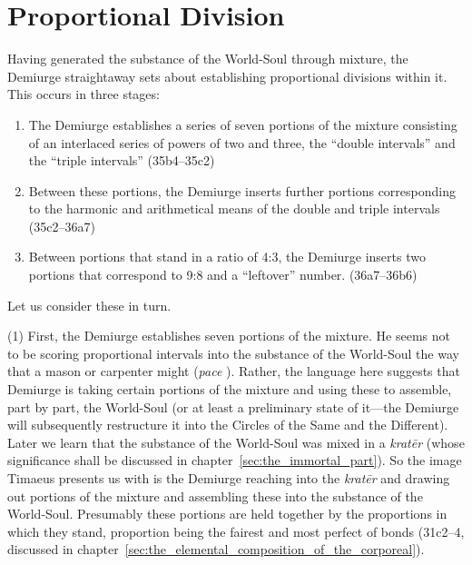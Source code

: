 
\section{Proportional Division} %
\label{sec:proportional_division}

Having generated the substance of the World-Soul through mixture, the Demiurge straightaway sets about establishing proportional divisions within it. This occurs in three stages:
\begin{enumerate}[(1)]
	\item The Demiurge establishes a series of seven portions of the mixture consisting of an interlaced series of powers of two and three, the ``double intervals'' and the ``triple intervals'' (35b4--35c2)
	\item Between these portions, the Demiurge inserts further portions corresponding to the harmonic and arithmetical means of the double and triple intervals (35c2--36a7)
	\item Between portions that stand in a ratio of 4:3, the Demiurge inserts two portions that correspond to 9:8 and a ``leftover'' number. (36a7--36b6)
\end{enumerate}
Let us consider these in turn.

(1) First, the Demiurge establishes seven portions of the mixture. He seems not to be scoring proportional intervals into the substance of the World-Soul the way that a mason or carpenter might (\emph{pace} \citealt{Robinson:1970lq}). Rather, the language here suggests that Demiurge is taking certain portions of the mixture and using these to assemble, part by part, the World-Soul (or at least a preliminary state of it---the Demiurge will subsequently restructure it into the Circles of the Same and the Different). Later we learn that the substance of the World-Soul was mixed in a \emph{kratēr} (whose significance shall be discussed in chapter~\ref{sec:the_immortal_part}). So the image Timaeus presents us with is the Demiurge reaching into the \emph{kratēr} and drawing out portions of the mixture and assembling these into the substance of the World-Soul. Presumably these portions are held together by the proportions in which they stand, proportion being the fairest and most perfect of bonds (31c2–4, discussed in chapter~\ref{sec:the_elemental_composition_of_the_corporeal}).

